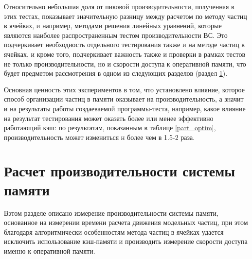 Относительно небольшая доля от пиковой производительности, полученная в этих тестах, показывает значительную разницу между расчетом по методу частиц в ячейках, и например, методами решения линейных уравнений, которые являются наиболее распространенным тестом производительности ВС. Это подчеркивает необходиость отдельного тестирования также и на методе частиц в ячейках, и кроме того, подчеркивает важность также и проверки в рамках тестов не только производительности, но и скорости доступа к оперативной памяти, что будет предметом рассмотрения в одном из следующих разделов (раздел \ref{perfRAM}). 

Основная ценность этих экспериментов в том, что установлено влияние, которое способ организации частиц в памяти оказывает на производительность, а значит и на результаты работы создаеваемой программы-теста, например, какое влияние на результат тестирования может оказать более или менее эффективно работающий кэш: по результатам, показанным в таблице \ref{part_optim}, производительность может измениться н более чем в 1.5-2 раза.


\section{Расчет производительности системы памяти}
\label{perfRAM}
Вэтом разделе описано измерение производительности системы памяти, основанное на измерении времени расчета движения модельных частиц, при этом благодаря алгоритмически особенностям метода частиц в ячейках удается исключить использование кэш-памяти и производить измерение скорости доступа именно к оперативной памяти.

